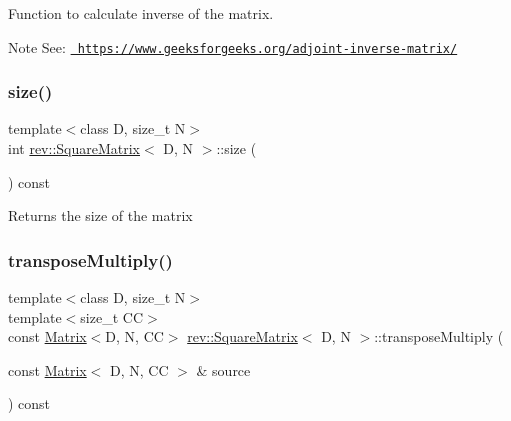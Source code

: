 Function to calculate inverse of the matrix. 

\begin{DoxyNote}{Note}
See\+: \href{https://www.geeksforgeeks.org/adjoint-inverse-matrix/}{\texttt{ https\+://www.\+geeksforgeeks.\+org/adjoint-\/inverse-\/matrix/}} 
\end{DoxyNote}
\mbox{\label{classrev_1_1_square_matrix_a866732338cc9fb3d1d0d786f10baf41e}} 
\subsubsection{\texorpdfstring{size()}{size()}}
{\footnotesize\ttfamily template$<$class D, size\+\_\+t N$>$ \\
int \mbox{\hyperlink{classrev_1_1_square_matrix}{rev\+::\+Square\+Matrix}}$<$ D, N $>$\+::size (\begin{DoxyParamCaption}{ }\end{DoxyParamCaption}) const\hspace{0.3cm}{\ttfamily [inline]}}

\begin{DoxyReturn}{Returns}
the size of the matrix 
\end{DoxyReturn}
\mbox{\label{classrev_1_1_square_matrix_a160ef125ea1c6e5f33078980b6e411d8}} 
\subsubsection{\texorpdfstring{transposeMultiply()}{transposeMultiply()}}
{\footnotesize\ttfamily template$<$class D, size\+\_\+t N$>$ \\
template$<$size\+\_\+t CC$>$ \\
const \mbox{\hyperlink{classrev_1_1_matrix}{Matrix}}$<$D, N, CC$>$ \mbox{\hyperlink{classrev_1_1_square_matrix}{rev\+::\+Square\+Matrix}}$<$ D, N $>$\+::transpose\+Multiply (\begin{DoxyParamCaption}\item[{const \mbox{\hyperlink{classrev_1_1_matrix}{Matrix}}$<$ D, N, CC $>$ \&}]{source }\end{DoxyParamCaption}) const\hspace{0.3cm}{\ttfamily [inline]}}



